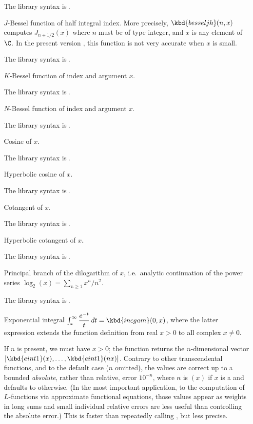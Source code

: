 The library syntax is .

\label{se:besseljh}
$J$-Bessel function of half integral index.
More precisely, $\kbd{besseljh}(n,x)$ computes $J_{n+1/2}(x)$ where $n$
must be of type integer, and $x$ is any element of $\C$. In the
present version \vers, this function is not very accurate when $x$ is small.

The library syntax is .

\label{se:besselk}
$K$-Bessel function of index  and argument $x$.

The library syntax is .

\label{se:besseln}
$N$-Bessel function of index  and argument $x$.

The library syntax is .

\label{se:cos}
Cosine of $x$.

The library syntax is .

\label{se:cosh}
Hyperbolic cosine of $x$.

The library syntax is .

\label{se:cotan}
Cotangent of $x$.

The library syntax is .

\label{se:cotanh}
Hyperbolic cotangent of $x$.

The library syntax is .

\label{se:dilog}
Principal branch of the dilogarithm of $x$,
i.e.~analytic continuation of the power series $\log_2(x)=\sum_{n\ge1}x^n/n^2$.

The library syntax is .

\label{se:eint1}
Exponential integral $\int_x^\infty \dfrac{e^{-t}}{t}\,dt =
\kbd{incgam}(0, x)$, where the latter expression extends the function
definition from real $x > 0$ to all complex $x \neq 0$.

If $n$ is present, we must have $x > 0$; the function returns the
$n$-dimensional vector $[\kbd{eint1}(x),\dots,\kbd{eint1}(nx)]$. Contrary to
other transcendental functions, and to the default case ($n$ omitted), the
values are correct up to a bounded \emph{absolute}, rather than relative,
error $10^{-n}$, where $n$ is $(x)$ if $x$ is a 
and defaults to  otherwise. (In the most important
application, to the computation of $L$-functions via approximate functional
equations, those values appear as weights in long sums and small individual
relative errors are less useful than controlling the absolute error.) This is
faster than repeatedly calling , but less precise.

